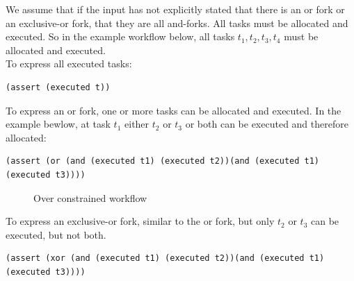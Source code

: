 \documentclass[a4paper]{report}
\begin{document}
We assume that if the input has not explicitly stated that there is an or fork or an exclusive-or fork, that they are all and-forks. All tasks must be allocated and executed. So in the example workflow below, all tasks $t_1, t_2, t_3, t_4$ must be allocated and executed.\\
To express all executed tasks:
\begin{lstlisting}[frame=single]
(assert (executed t))
\end{lstlisting}
\begin{center}
\end{center}

To express an or fork, one or more tasks can be allocated and executed. In the example bewlow, at task $t_1$ either $t_2$ or $t_3$ or both can be executed and therefore allocated:
\begin{lstlisting}[frame=single]
(assert (or (and (executed t1) (executed t2))(and (executed t1) (executed t3))))
\end{lstlisting}
\begin{figure}[!htb]
\centering
{}
\caption{Over constrained workflow}
\label{fig:Over constrained workflow}
\end{figure}

To express an exclusive-or fork, similar to the or fork, but only $t_2$ or $t_3$ can be executed, but not both.
\begin{lstlisting}[frame=single]
(assert (xor (and (executed t1) (executed t2))(and (executed t1) (executed t3))))
\end{lstlisting}
\end{document}
